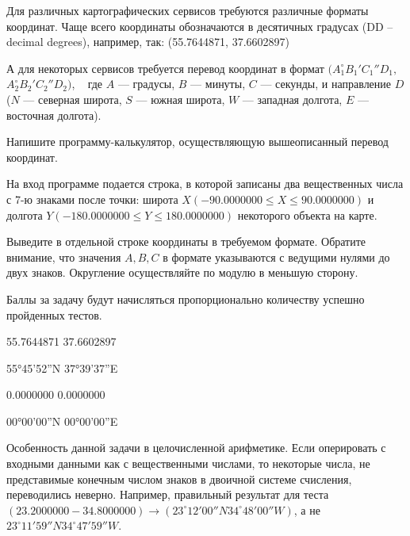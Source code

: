 
Для различных картографических сервисов требуются различные форматы координат. Чаще всего 
координаты обозначаются в десятичных градусах (DD -- decimal degrees), например, так:
(55.7644871, 37.6602897)  

А для некоторых сервисов требуется перевод координат в формат $(A_1^{\circ}B_1'C_1''D_1,$ $A_2^{\circ}B_2'C_2''D_2)$,  
где $A$  — градусы, $B$  — минуты, $C$  — секунды, и направление $D$  ($N$  — северная широта, $S$  — южная широта,
 $W$  — западная долгота, $E$  — восточная долгота).
 
Напишите программу-калькулятор, осуществляющую вышеописанный перевод координат. 


На вход программе подается строка, в которой записаны два вещественных числа с 7-ю знаками после точки: широта 
$X(-90.0000000 \leq X \leq 90.0000000)$ и долгота $Y(-180.0000000 \leq Y \leq 180.0000000)$ некоторого объекта на карте.

\outputfmtSection

Выведите в отдельной строке координаты в требуемом формате. Обратите внимание, что значения $A , B , C$  в формате указываются с ведущими нулями до двух знаков. Округление осуществляйте по модулю в меньшую сторону.

\markSection

Баллы за задачу будут начисляться пропорционально количеству успешно пройденных тестов.


\begin{myverbbox}[\small]{\vinput}
    55.7644871 37.6602897
\end{myverbbox}
\begin{myverbbox}[\small]{\voutput}
   55°45'52''N 37°39'37''E
\end{myverbbox}


\begin{myverbbox}[\small]{\vinput}
    0.0000000 0.0000000
\end{myverbbox}
\begin{myverbbox}[\small]{\voutput}
   00°00'00''N 00°00'00''E
\end{myverbbox}

\solutionSection
Особенность данной задачи в целочисленной арифметике. Если оперировать с входными данными как с вещественными числами, то некоторые числа, не представимые конечным числом знаков в двоичной системе счисления, переводились неверно. Например, правильный результат для теста $(23.2000000 -34.8000000) \rightarrow (23^\circ12'00''N 34^\circ48'00''W)$, а не $23^\circ11'59''N 34^\circ47'59''W$.

